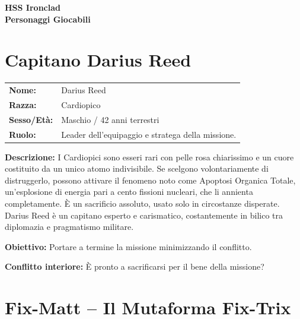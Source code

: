 \documentclass[11pt,a4paper]{article}
\begin{document}
\begin{center}
\Huge\textbf{\textcolor{miningorange}{HSS Ironclad}}\\[0.5cm]
\Large\textbf{Personaggi Giocabili}
\end{center}


\section{Capitano Darius Reed}

\begin{tcolorbox}[colback=mininglightorange!20, colframe=miningorange]
\begin{tabularx}{\textwidth}{lX}
\textbf{Nome:} & Darius Reed \\
\textbf{Razza:} & Cardiopico \\
\textbf{Sesso/Età:} & Maschio / 42 anni terrestri \\
\textbf{Ruolo:} & Leader dell’equipaggio e stratega della missione. \\
\end{tabularx}

\textbf{Descrizione:} I Cardiopici sono esseri rari con pelle rosa chiarissimo e un cuore costituito da un unico atomo indivisibile. Se scelgono volontariamente di distruggerlo, possono attivare il fenomeno noto come Apoptosi Organica Totale, un’esplosione di energia pari a cento fissioni nucleari, che li annienta completamente. È un sacrificio assoluto, usato solo in circostanze disperate. Darius Reed è un capitano esperto e carismatico, costantemente in bilico tra diplomazia e pragmatismo militare.


\textbf{Obiettivo:} Portare a termine la missione minimizzando il conflitto.

\textbf{Conflitto interiore:} È pronto a sacrificarsi per il bene della missione?
\end{tcolorbox}


\section{Fix-Matt – Il Mutaforma Fix-Trix}
\end{document}
